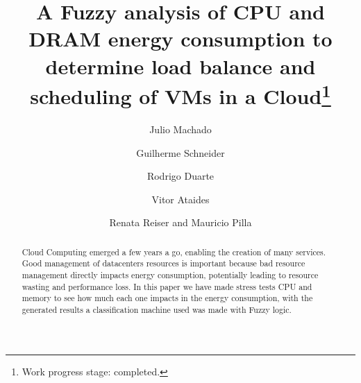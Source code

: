 \documentclass[runningheads,a4paper]{llncs}
\begin{document}
\mainmatter  %

\title{A Fuzzy analysis of CPU and DRAM energy consumption to determine load balance and scheduling of VMs in a Cloud\footnote{Work progress stage: completed.}}


%
%
\author{Julio Machado%
%
\and Guilherme Schneider\and Rodrigo Duarte \and Vitor Ataides \and Renata Reiser and Mauricio Pilla}
%


%
%

\maketitle
\begin{abstract}
Cloud Computing emerged a few years a go, enabling the creation of many services. Good management of datacenters resources is important because bad resource management directly impacts energy consumption, potentially leading to resource wasting and performance loss. In this paper we have made stress tests CPU and memory to see how much each one impacts in the energy consumption, with the generated results a classification machine used was made with Fuzzy logic.



\end{abstract}
\end{document}
